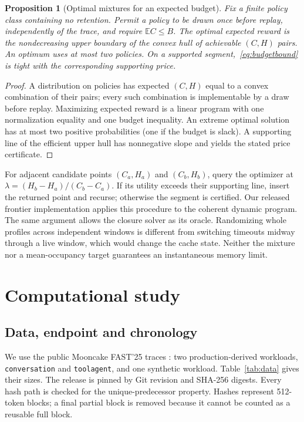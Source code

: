 \documentclass[11pt,a4paper]{article}
\newtheorem{proposition}[theorem]{Proposition}
\begin{document}
\begin{proposition}[Optimal mixtures for an expected budget]\label{prop:mixtures}
Fix a finite policy class containing no retention. Permit a policy to be drawn
once before replay, independently of the trace, and require $\mathbb E C\leq B$.
The optimal expected reward is the nondecreasing upper boundary of the convex
hull of achievable $(C,H)$ pairs. An optimum uses at most two policies. On a
supported segment,~\eqref{eq:budgetbound} is tight with the corresponding
supporting price.
\end{proposition}
\begin{proof}
A distribution on policies has expected $(C,H)$ equal to a convex combination
of their pairs; every such combination is implementable by a draw before replay.
Maximizing expected reward is a linear program with one normalization equality
and one budget inequality. An extreme optimal solution has at most two positive
probabilities (one if the budget is slack). A supporting line of the efficient
upper hull has nonnegative slope and yields the stated price certificate.
\end{proof}

For adjacent candidate points $(C_a,H_a)$ and $(C_b,H_b)$, query the optimizer at
$\lambda=(H_b-H_a)/(C_b-C_a)$. If its utility exceeds their supporting line, insert
the returned point and recurse; otherwise the segment is certified. Our released
frontier implementation applies this procedure to the coherent dynamic program.
The same argument allows the closure solver as its oracle. Randomizing whole
profiles across independent windows is different from switching timeouts midway
through a live window, which would change the cache state. Neither the mixture
nor a mean-occupancy target guarantees an instantaneous memory limit.

\section{Computational study}\label{sec:exp}
\subsection{Data, endpoint and chronology}
We use the public Mooncake FAST'25 traces \cite{trace,mooncake}: two
production-derived workloads, \texttt{conversation} and \texttt{toolagent}, and
one synthetic workload. Table~\ref{tab:data} gives their sizes. The release is
pinned by Git revision and SHA-256 digests. Every hash path is checked for the
unique-predecessor property. Hashes represent 512-token blocks; a final partial
block is removed because it cannot be counted as a reusable full block.
\end{document}
